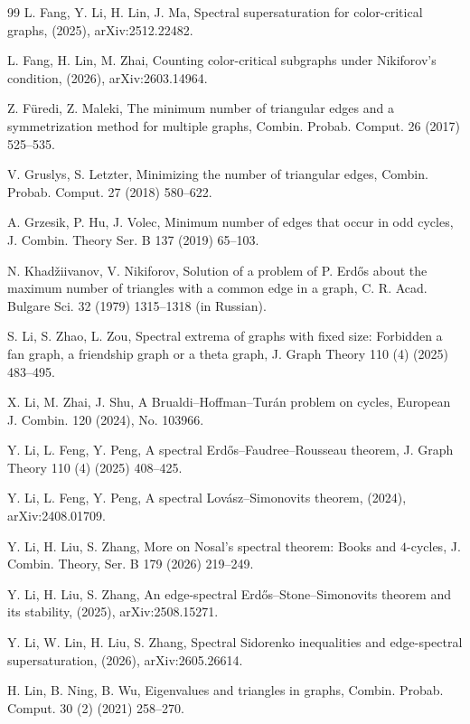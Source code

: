 \documentclass[11pt,a4paper]{article}
\theoremstyle{definition}
\theoremstyle{plain}
\begin{document}
\begin{thebibliography}{99}
L. Fang, Y. Li, H. Lin, J. Ma, 
Spectral supersaturation for color-critical graphs, (2025), arXiv:2512.22482. 

L. Fang, H. Lin, M. Zhai, 
Counting color-critical subgraphs under Nikiforov's condition, (2026), arXiv:2603.14964. 

Z. F\"{u}redi, Z. Maleki, 
The minimum number of triangular edges and a symmetrization method for multiple graphs, 
Combin. Probab.  Comput. 26 (2017)  525--535.  

V. Gruslys, S. Letzter, 
Minimizing the number of triangular edges, 
Combin. Probab.  Comput. 27 (2018) 580--622. 

A. Grzesik, P. Hu, J. Volec, 
Minimum number of edges that occur in odd cycles, 
J. Combin. Theory Ser. B 137 (2019) 65--103. 

N. Khad\v{z}iivanov, V. Nikiforov, 
Solution of a problem of P. Erd\H{o}s about the maximum number of triangles 
with a common edge in a graph, 
C. R. Acad. Bulgare Sci. 32 (1979) 1315--1318 (in Russian).

S. Li, S. Zhao, L. Zou, 
Spectral extrema of graphs with fixed size: Forbidden a fan graph, a friendship graph or a theta graph, 
J. Graph Theory 110 (4) (2025) 483--495.

X. Li, M. Zhai, J. Shu, 
A Brualdi--Hoffman--Tur\'{a}n problem on cycles, European J. Combin. 120 (2024), No. 103966.

Y. Li, L. Feng, Y. Peng, 
A spectral Erd\H{o}s--Faudree--Rousseau theorem, 
J. Graph Theory 110 (4) (2025) 408--425.  


Y. Li, L. Feng, Y. Peng,
A spectral Lov\'asz--Simonovits theorem, (2024), 
arXiv:2408.01709.

Y. Li, H. Liu, S. Zhang,
More on Nosal's spectral theorem: Books and $4$-cycles,
{J. Combin. Theory, Ser. B} {179} (2026) 219--249.

Y. Li, H. Liu, S. Zhang, 
An edge-spectral Erd\H{o}s--Stone--Simonovits theorem and its stability, 
 (2025), arXiv:2508.15271. 

Y. Li, W. Lin,  H. Liu, S. Zhang, 
Spectral Sidorenko inequalities and edge-spectral supersaturation, (2026), arXiv:2605.26614.  


H. Lin, B. Ning, B. Wu, 
Eigenvalues and triangles in graphs, 
Combin. Probab. Comput. 30 (2) (2021) 258--270.


\end{thebibliography}
\end{document}
